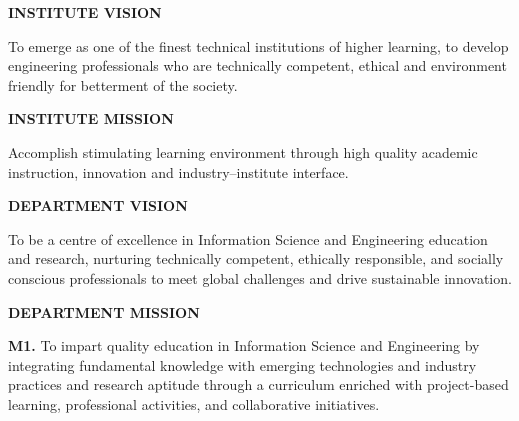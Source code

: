 \thispagestyle{empty}

\begin{center}
\begin{minipage}{0.92\textwidth}
\small

\vspace{0.25cm}

\begin{center}
{\large\bfseries\textcolor{cyan!70!blue}{INSTITUTE VISION}}
\end{center}

To emerge as one of the finest technical institutions of higher learning,
to develop engineering professionals who are technically competent,
ethical and environment friendly for betterment of the society.

\vspace{0.25cm}

\begin{center}
{\large\bfseries\textcolor{cyan!70!blue}{INSTITUTE MISSION}}
\end{center}

Accomplish stimulating learning environment through high quality
academic instruction, innovation and industry--institute interface.

\vspace{0.25cm}

\begin{center}
{\large\bfseries\textcolor{cyan!70!blue}{DEPARTMENT VISION}}
\end{center}

To be a centre of excellence in Information Science and Engineering
education and research, nurturing technically competent, ethically
responsible, and socially conscious professionals to meet global
challenges and drive sustainable innovation.

\vspace{0.25cm}

\begin{center}
{\large\bfseries\textcolor{cyan!70!blue}{DEPARTMENT MISSION}}
\end{center}

\textbf{M1.}
To impart quality education in Information Science and Engineering by
integrating fundamental knowledge with emerging technologies and
industry practices and research aptitude through a curriculum enriched
with project-based learning, professional activities, and collaborative
initiatives.

\vspace{0.12cm}


\end{minipage}
\end{center}
